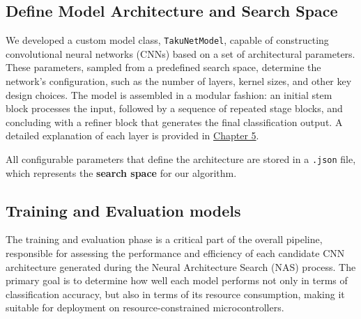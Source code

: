 \subsection{Define Model Architecture and Search Space}

We developed a custom model class, \texttt{TakuNetModel}, capable of constructing convolutional neural networks (CNNs) based on a set of architectural parameters. These parameters, sampled from a predefined search space, determine the network's configuration, such as the number of layers, kernel sizes, and other key design choices. The model is assembled in a modular fashion: an initial stem block processes the input, followed by a sequence of repeated stage blocks, and concluding with a refiner block that generates the final classification output. A detailed explanation of each layer is provided in \hyperref[chap:Architecture]{Chapter 5}.

All configurable parameters that define the architecture are stored in a \texttt{.json} file, which represents the \textbf{search space} for our algorithm.



\subsection{Training and Evaluation models}

The training and evaluation phase is a critical part of the overall pipeline, responsible for assessing the performance and efficiency of each candidate CNN architecture generated during the Neural Architecture Search (NAS) process. The primary goal is to determine how well each model performs not only in terms of classification accuracy, but also in terms of its resource consumption, making it suitable for deployment on resource-constrained microcontrollers.

